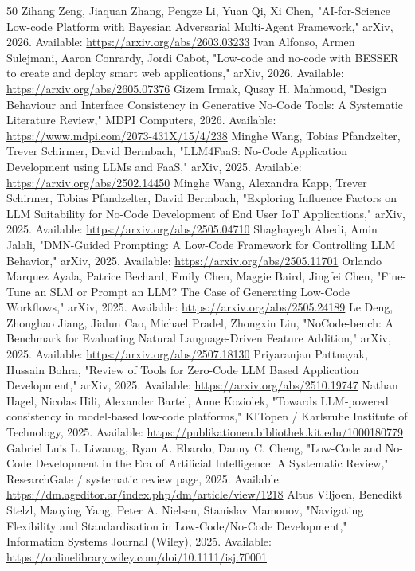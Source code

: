 \documentclass[conference]{IEEEtran}
\begin{document}
\balance
\begin{thebibliography}{50}
 Zihang Zeng, Jiaquan Zhang, Pengze Li, Yuan Qi, Xi Chen, "AI-for-Science Low-code Platform with Bayesian Adversarial Multi-Agent Framework," arXiv, 2026. Available: \url{https://arxiv.org/abs/2603.03233}
 Ivan Alfonso, Armen Sulejmani, Aaron Conrardy, Jordi Cabot, "Low-code and no-code with BESSER to create and deploy smart web applications," arXiv, 2026. Available: \url{https://arxiv.org/abs/2605.07376}
 Gizem Irmak, Qusay H. Mahmoud, "Design Behaviour and Interface Consistency in Generative No-Code Tools: A Systematic Literature Review," MDPI Computers, 2026. Available: \url{https://www.mdpi.com/2073-431X/15/4/238}
 Minghe Wang, Tobias Pfandzelter, Trever Schirmer, David Bermbach, "LLM4FaaS: No-Code Application Development using LLMs and FaaS," arXiv, 2025. Available: \url{https://arxiv.org/abs/2502.14450}
 Minghe Wang, Alexandra Kapp, Trever Schirmer, Tobias Pfandzelter, David Bermbach, "Exploring Influence Factors on LLM Suitability for No-Code Development of End User IoT Applications," arXiv, 2025. Available: \url{https://arxiv.org/abs/2505.04710}
 Shaghayegh Abedi, Amin Jalali, "DMN-Guided Prompting: A Low-Code Framework for Controlling LLM Behavior," arXiv, 2025. Available: \url{https://arxiv.org/abs/2505.11701}
 Orlando Marquez Ayala, Patrice Bechard, Emily Chen, Maggie Baird, Jingfei Chen, "Fine-Tune an SLM or Prompt an LLM? The Case of Generating Low-Code Workflows," arXiv, 2025. Available: \url{https://arxiv.org/abs/2505.24189}
 Le Deng, Zhonghao Jiang, Jialun Cao, Michael Pradel, Zhongxin Liu, "NoCode-bench: A Benchmark for Evaluating Natural Language-Driven Feature Addition," arXiv, 2025. Available: \url{https://arxiv.org/abs/2507.18130}
 Priyaranjan Pattnayak, Hussain Bohra, "Review of Tools for Zero-Code LLM Based Application Development," arXiv, 2025. Available: \url{https://arxiv.org/abs/2510.19747}
 Nathan Hagel, Nicolas Hili, Alexander Bartel, Anne Koziolek, "Towards LLM-powered consistency in model-based low-code platforms," KITopen / Karlsruhe Institute of Technology, 2025. Available: \url{https://publikationen.bibliothek.kit.edu/1000180779}
 Gabriel Luis L. Liwanag, Ryan A. Ebardo, Danny C. Cheng, "Low-Code and No-Code Development in the Era of Artificial Intelligence: A Systematic Review," ResearchGate / systematic review page, 2025. Available: \url{https://dm.ageditor.ar/index.php/dm/article/view/1218}
 Altus Viljoen, Benedikt Stelzl, Maoying Yang, Peter A. Nielsen, Stanislav Mamonov, "Navigating Flexibility and Standardisation in Low-Code/No-Code Development," Information Systems Journal (Wiley), 2025. Available: \url{https://onlinelibrary.wiley.com/doi/10.1111/isj.70001}

\end{thebibliography}
\end{document}
